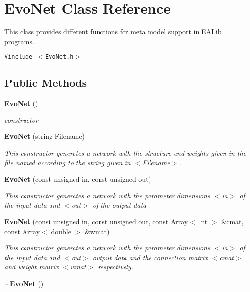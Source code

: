 \section{Evo\-Net Class Reference}
\label{classEvoNet}
This class provides different functions for meta model support in EALib programs. 


{\tt \#include $<$Evo\-Net.h$>$}

\subsection*{Public Methods}
\begin{CompactItemize}
\item 
{}
{\bf Evo\-Net} ()\label{classEvoNet_a0}

\begin{CompactList}\small\item\em constructor\item\end{CompactList}\item 
{\bf Evo\-Net} (string Filename)
\begin{CompactList}\small\item\em This constructor generates a network with the structure and weights given in the file named according to the string given in $<$Filename$>$.\item\end{CompactList}\item 
{\bf Evo\-Net} (const unsigned in, const unsigned out)
\begin{CompactList}\small\item\em This constructor generates a network with the parameter dimensions $<$in$>$ of the input data and $<$out$>$ of the output data .\item\end{CompactList}\item 
{\bf Evo\-Net} (const unsigned in, const unsigned out, const Array$<$ int $>$ \&cmat, const Array$<$ double $>$ \&wmat)
\begin{CompactList}\small\item\em This constructor generates a network with the parameter dimensions $<$in$>$ of the input data and $<$out$>$ output data and the connection matrix $<$cmat$>$ and weight matrix $<$wmat$>$ respectively.\item\end{CompactList}\item 
{}
{\bf $\sim$Evo\-Net} ()\label{classEvoNet_a4}


\end{CompactItemize}
